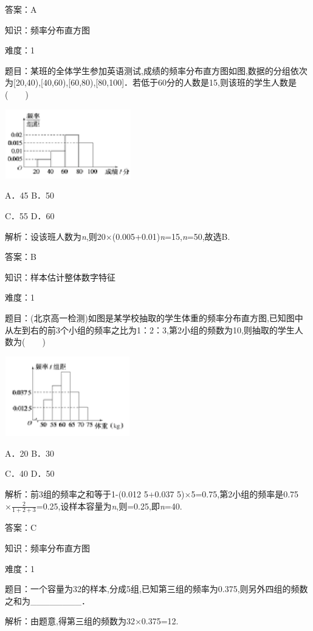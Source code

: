 \documentclass{article} %
\begin{document}
答案：A

知识：频率分布直方图

难度：1

题目：某班的全体学生参加英语测试,成绩的频率分布直方图如图,数据的分组依次为[20,40),[40,60),[60,80),[80,100]．若低于60分的人数是15,则该班的学生人数是(　　)

\includegraphics*[width=2.17in, height=1.19in, keepaspectratio=false]{image83}

A．45  B．50

C．55  D．60

解析：设该班人数为\textit{n},则20$\mathrm{\times}$(0.005+0.01)\textit{n}=15,\textit{n}=50,故选B.

答案：B

知识：样本估计整体数字特征

难度：1

题目：(北京高一检测)如图是某学校抽取的学生体重的频率分布直方图,已知图中从左到右的前3个小组的频率之比为1：2：3,第2小组的频数为10,则抽取的学生人数为(　　)

\includegraphics*[width=2.15in, height=1.37in, keepaspectratio=false]{image84}

A．20  B．30

C．40  D．50

解析：前3组的频率之和等于1-(0.012 5+0.037 5)$\mathrm{\times}$5=0.75,第2小组的频率是0.75$\mathrm{\times}\frac{2}{1+2+3}$=0.25,设样本容量为\textit{n},则=0.25,即\textit{n}=40.

答案：C

知识：频率分布直方图

难度：1

题目：一个容量为32的样本,分成5组,已知第三组的频率为0.375,则另外四组的频数之和为\_\_\_\_\_\_\_\_．

解析：由题意,得第三组的频数为32$\mathrm{\times}$0.375=12.
\end{document}
